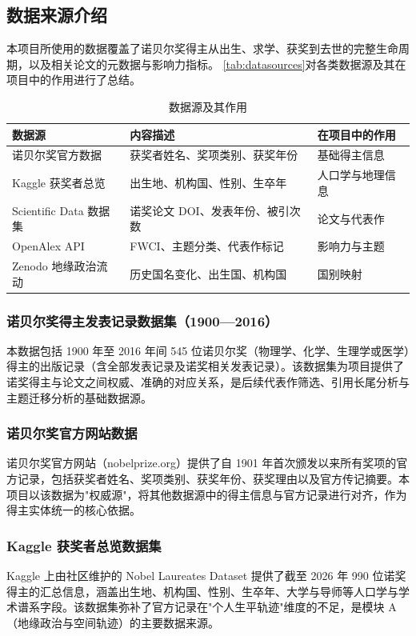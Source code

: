 \documentclass[UTF8]{CjC}
\theoremstyle{mystyle}
\begin{document}
\subsection{数据来源介绍}
本项目所使用的数据覆盖了诺贝尔奖得主从出生、求学、获奖到去世的完整生命周期，以及相关论文的元数据与影响力指标。
\autoref{tab:datasources}对各类数据源及其在项目中的作用进行了总结。
\begin{table}[H]
\centering
\caption{数据源及其作用}
\label{tab:datasources}
\begin{tabular}{lll}
\toprule
数据源 & 内容描述 & 在项目中的作用 \\
\midrule
诺贝尔奖官方数据 & 获奖者姓名、奖项类别、获奖年份 & 基础得主信息 \\
Kaggle 获奖者总览 & 出生地、机构国、性别、生卒年 & 人口学与地理信息 \\
Scientific Data 数据集 & 诺奖论文 DOI、发表年份、被引次数 & 论文与代表作 \\
OpenAlex API & FWCI、主题分类、代表作标记 & 影响力与主题 \\
Zenodo 地缘政治流动 & 历史国名变化、出生国、机构国 & 国别映射 \\
\bottomrule
\end{tabular}
\end{table}
\subsubsection{诺贝尔奖得主发表记录数据集（1900—2016）}
本数据包括 1900 年至 2016 年间 545 位诺贝尔奖（物理学、化学、生理学或医学）得主的出版记录（含全部发表记录及诺奖相关发表记录）。该数据集为项目提供了诺奖得主与论文之间权威、准确的对应关系，是后续代表作筛选、引用长尾分析与主题迁移分析的基础数据源。

\subsubsection{诺贝尔奖官方网站数据}
诺贝尔奖官方网站（nobelprize.org）提供了自 1901 年首次颁发以来所有奖项的官方记录，包括获奖者姓名、奖项类别、获奖年份、获奖理由以及官方传记摘要。本项目以该数据为"权威源"，将其他数据源中的得主信息与官方记录进行对齐，作为得主实体统一的核心依据。

\subsubsection{Kaggle 获奖者总览数据集}
Kaggle 上由社区维护的 Nobel Laureates Dataset 提供了截至 2026 年 990 位诺奖得主的汇总信息，涵盖出生地、机构国、性别、生卒年、大学与导师等人口学与学术谱系字段。该数据集弥补了官方记录在"个人生平轨迹"维度的不足，是模块 A（地缘政治与空间轨迹）的主要数据来源。
\end{document}
